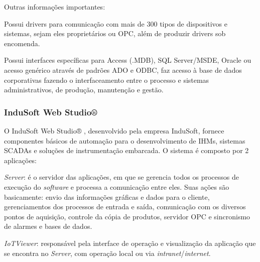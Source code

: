     
    Outras informações importantes:
    
    \begin{alineascomponto}
    	\item Possui drivers para comunicação com mais de 300 tipos de dispositivos e sistemas, sejam eles proprietários ou \gls{OPC}, além de produzir drivers sob encomenda.
    	\item Possui interfaces específicas para Access (.MDB), SQL Server/MSDE, Oracle ou acesso genérico através de padrões ADO e ODBC, faz acesso à base de dados corporativas fazendo o interfaceamento entre o processo e sistemas administrativos, de produção, manutenção e gestão.
    \end{alineascomponto}
    
\subsubsection{InduSoft Web Studio®}
\label{sec:indusoft}

    O InduSoft Web Studio® \cite{InduSoft}, desenvolvido pela empresa InduSoft, fornece componentes básicos de automação para o desenvolvimento de \glspl{IHM}, sistemas \glspl{SCADA} e soluções de instrumentação embarcada. O sistema é composto por 2 aplicações:
    
    \begin{alineascomponto}
        \item \textit{Server}: é o servidor das aplicações, em que se gerencia todos os processos de execução do \textit{software} e processa a comunicação entre eles. Suas ações são basicamente: envio das informações gráficas e dados para o cliente, gerenciamentos dos processos de entrada e saída,  comunicação com os diversos pontos de aquisição, controle da cópia de produtos, servidor OPC e sincronismo de alarmes e bases de dados.
    	\item \textit{IoTViewer}: responsável pela interface de operação e visualização da aplicação que se encontra no \textit{Server}, com operação local ou via \textit{intranet}/\textit{internet}.
    \end{alineascomponto}

